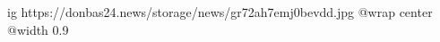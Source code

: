  
 
 
 
 

\ifcmt
  ig https://donbas24.news/storage/news/gr72ah7emj0bevdd.jpg
  @wrap center
  @width 0.9
\fi
